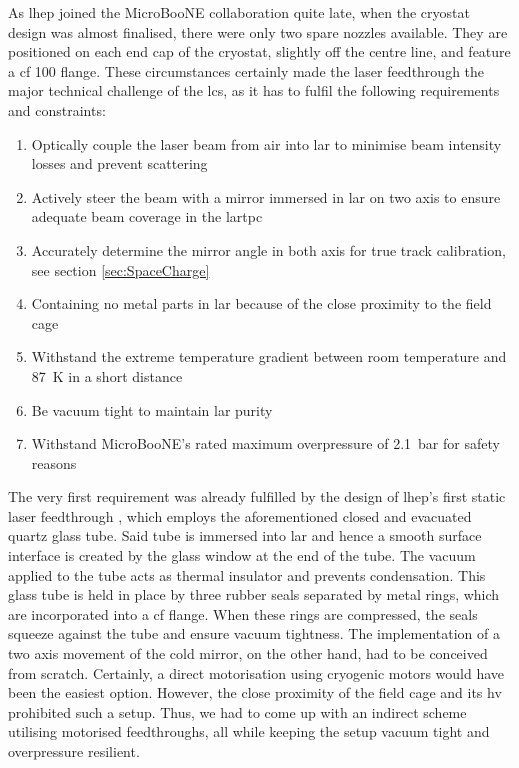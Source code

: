 As \gls{lhep} joined the MicroBooNE collaboration quite late, when the cryostat design was almost finalised, there were only two spare nozzles available. They are positioned on each end cap of the cryostat, slightly off the centre line, and feature a \gls{cf} \num{100} flange. These circumstances certainly made the laser feedthrough the major technical challenge of the \gls{lcs}, as it has to fulfil the following requirements and constraints:
\begin{enumerate}
    \item Optically couple the laser beam from air into \gls{lar} to minimise beam intensity losses and prevent scattering
    \item Actively steer the beam with a mirror immersed in \gls{lar} on two axis to ensure adequate beam coverage in the \gls{lartpc}
    \item Accurately determine the mirror angle in both axis for true track calibration, see section \ref{sec:SpaceCharge} 
    \item Containing no metal parts in \gls{lar} because of the close proximity to the field cage
    \item Withstand the extreme temperature gradient between room temperature and \SI{87}{\kelvin} in a short distance
    \item Be vacuum tight to maintain \gls{lar} purity
    \item Withstand MicroBooNE's rated maximum overpressure of \SI{2.1}{\bar} for safety reasons
\end{enumerate}
The very first requirement was already fulfilled by the design of \gls{lhep}'s first static laser feedthrough \cite{LArLaserLHEP}, which employs the aforementioned closed and evacuated quartz glass tube. Said tube is immersed into \gls{lar} and hence a smooth surface interface is created by the glass window at the end of the tube. The vacuum applied to the tube acts as thermal insulator and prevents condensation. This glass tube is held in place by three rubber seals separated by metal rings, which are incorporated into a \gls{cf} flange. When these rings are compressed, the seals squeeze against the tube and ensure vacuum tightness. The implementation of a two axis movement of the cold mirror, on the other hand, had to be conceived from scratch. Certainly, a direct motorisation using cryogenic motors would have been the easiest option. However, the close proximity of the field cage and its \gls{hv} prohibited such a setup. Thus, we had to come up with an indirect scheme utilising motorised feedthroughs, all while keeping the setup vacuum tight and overpressure resilient.

